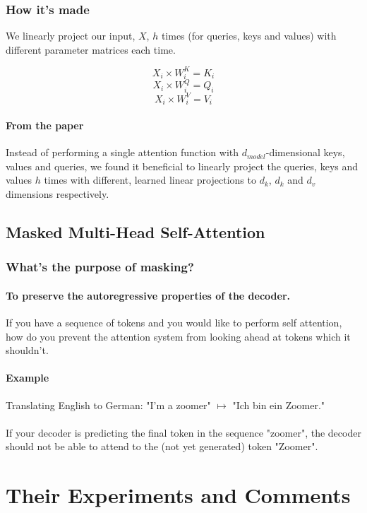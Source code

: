 \documentclass{article}
\begin{document}
    \subsubsection{How it's made}
    We linearly project our input, $X$, $h$ times (for queries, keys and values) with different parameter matrices each time.

    \[ X_i \times W_i^K = K_i\]
    \[ X_i \times W_i^Q = Q_i \]
    \[ X_i \times W_i^V = V_i \]

    \paragraph{From the paper} Instead of performing a single attention function with
    \linebreak
    $d_{model}$-dimensional keys, values and queries, we found it beneficial to linearly project the queries, keys and values $h$ times with different, learned linear projections to $d_k$, $d_k$ and $d_v$ dimensions respectively.

    \subsection{Masked Multi-Head Self-Attention}
    \subsubsection{What's the purpose of masking?}
    \paragraph{To preserve the autoregressive properties of the decoder.}
    If you have a sequence of tokens and you would like to perform self attention, how do you prevent the attention system from looking ahead at tokens which it shouldn't.
    \paragraph{Example} Translating English to German: 
    "I'm a zoomer" $\mapsto$ "Ich bin ein Zoomer."
    \paragraph{} If your decoder is predicting the final token in the sequence "zoomer", the decoder should not be able to attend to the (not yet generated) token "Zoomer". 



    \section{Their Experiments and Comments}
\end{document}
